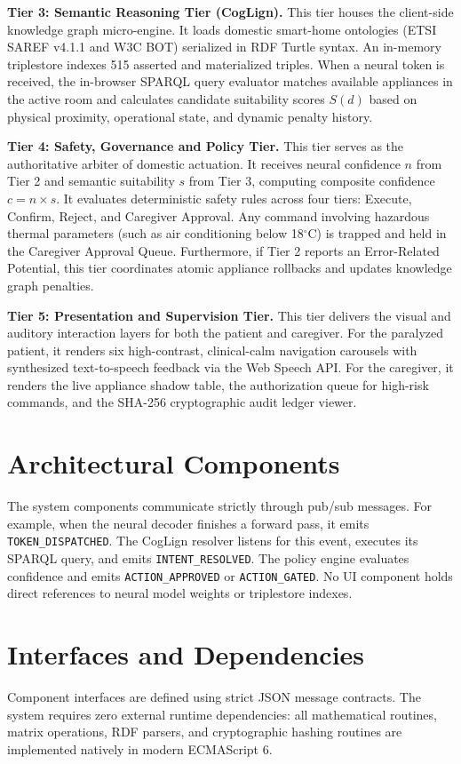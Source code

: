 \documentclass[12pt,a4paper]{report}
\begin{document}
\textbf{Tier 3: Semantic Reasoning Tier (CogLign).} This tier houses the client-side knowledge graph micro-engine. It loads domestic smart-home ontologies (ETSI SAREF v4.1.1 and W3C BOT) serialized in RDF Turtle syntax. An in-memory triplestore indexes 515 asserted and materialized triples. When a neural token is received, the in-browser SPARQL query evaluator matches available appliances in the active room and calculates candidate suitability scores $S(d)$ based on physical proximity, operational state, and dynamic penalty history.

\textbf{Tier 4: Safety, Governance and Policy Tier.} This tier serves as the authoritative arbiter of domestic actuation. It receives neural confidence $n$ from Tier 2 and semantic suitability $s$ from Tier 3, computing composite confidence $c = n \times s$. It evaluates deterministic safety rules across four tiers: Execute, Confirm, Reject, and Caregiver Approval. Any command involving hazardous thermal parameters (such as air conditioning below 18$^\circ$C) is trapped and held in the Caregiver Approval Queue. Furthermore, if Tier 2 reports an Error-Related Potential, this tier coordinates atomic appliance rollbacks and updates knowledge graph penalties.

\textbf{Tier 5: Presentation and Supervision Tier.} This tier delivers the visual and auditory interaction layers for both the patient and caregiver. For the paralyzed patient, it renders six high-contrast, clinical-calm navigation carousels with synthesized text-to-speech feedback via the Web Speech API. For the caregiver, it renders the live appliance shadow table, the authorization queue for high-risk commands, and the SHA-256 cryptographic audit ledger viewer.

\section{Architectural Components}
The system components communicate strictly through pub/sub messages. For example, when the neural decoder finishes a forward pass, it emits \texttt{TOKEN\_DISPATCHED}. The CogLign resolver listens for this event, executes its SPARQL query, and emits \texttt{INTENT\_RESOLVED}. The policy engine evaluates confidence and emits \texttt{ACTION\_APPROVED} or \texttt{ACTION\_GATED}. No UI component holds direct references to neural model weights or triplestore indexes.

\section{Interfaces and Dependencies}
Component interfaces are defined using strict JSON message contracts. The system requires zero external runtime dependencies: all mathematical routines, matrix operations, RDF parsers, and cryptographic hashing routines are implemented natively in modern ECMAScript 6.
\end{document}
